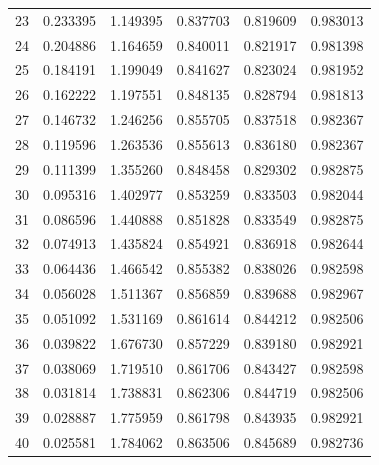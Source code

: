 \begin{table}[ht]
{\begin{tabular}{c c c c c c}
23 & 0.233395 & 1.149395 & 0.837703 & 0.819609 & 0.983013 \\
24 & 0.204886 & 1.164659 & 0.840011 & 0.821917 & 0.981398 \\
25 & 0.184191 & 1.199049 & 0.841627 & 0.823024 & 0.981952 \\
26 & 0.162222 & 1.197551 & 0.848135 & 0.828794 & 0.981813 \\
27 & 0.146732 & 1.246256 & 0.855705 & 0.837518 & 0.982367 \\
28 & 0.119596 & 1.263536 & 0.855613 & 0.836180 & 0.982367 \\
29 & 0.111399 & 1.355260 & 0.848458 & 0.829302 & 0.982875 \\
30 & 0.095316 & 1.402977 & 0.853259 & 0.833503 & 0.982044 \\
31 & 0.086596 & 1.440888 & 0.851828 & 0.833549 & 0.982875 \\
32 & 0.074913 & 1.435824 & 0.854921 & 0.836918 & 0.982644 \\
33 & 0.064436 & 1.466542 & 0.855382 & 0.838026 & 0.982598 \\
34 & 0.056028 & 1.511367 & 0.856859 & 0.839688 & 0.982967 \\
35 & 0.051092 & 1.531169 & 0.861614 & 0.844212 & 0.982506 \\
36 & 0.039822 & 1.676730 & 0.857229 & 0.839180 & 0.982921 \\
37 & 0.038069 & 1.719510 & 0.861706 & 0.843427 & 0.982598 \\
38 & 0.031814 & 1.738831 & 0.862306 & 0.844719 & 0.982506 \\
39 & 0.028887 & 1.775959 & 0.861798 & 0.843935 & 0.982921 \\
40 & 0.025581 & 1.784062 & 0.863506 & 0.845689 & 0.982736 \\
\hline
\end{tabular}
}
\end{table}


